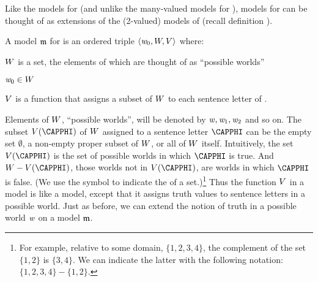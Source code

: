 Like the models for \GQL{} (and unlike the many-valued models for \GSL{}), models for \MGSL{} can be thought of as extensions of the (2-valued) models of \GSL{} (recall definition ).
\begin{majorILnc}{}
A model $\mathfrak{m}$ for \MGSL{} is an ordered triple $\langle\mathit{w}_0,W,V\rangle$ where:
\begin{cenumerate}
\item $W$ is a set, the elements of which are thought of as ``possible worlds''
\item $\mathit{w}_0\in W$
\item $V$ is a function that assigns a subset of $W$ to each sentence letter of \MGSL{}.
\end{cenumerate}
\end{majorILnc}
\noindent{}Elements of $W$, ``possible worlds'', will be denoted by $\mathit{w},\mathit{w}_1,\mathit{w}_2$ and so on. 
The subset $\integer{V}(\CAPPHI)$ of $W$ assigned to a sentence letter $\CAPPHI$ can be the empty set $\emptyset$, a non-empty proper subset of $W$, or all of $W$ itself. 
Intuitively, the set $\integer{V}(\CAPPHI)$ is the set of possible worlds in which $\CAPPHI$ is true.  And $\integer{W}-\integer{V}(\CAPPHI)$, those worlds not in $\integer{V}(\CAPPHI)$, are worlds in which $\CAPPHI$ is false.  (We use the \mention{$-$} symbol to indicate the  of a set.)\footnote{For example, relative to some domain, $\{ 1, 2, 3, 4\}$, the complement of the set $\{1, 2\}$ is $\{3, 4\}$.  We can indicate the latter with the following notation: $\{ 1, 2, 3, 4\}-\{1, 2\}$.}
Thus the function $V$ in a \MGSL{} model is like a \GSL{} model, except that it assigns truth values to sentence letters in a possible world. 
Just as before, we can extend the notion of truth in a possible world $\mathit{w}$ on a model $\mathfrak{m}$.
